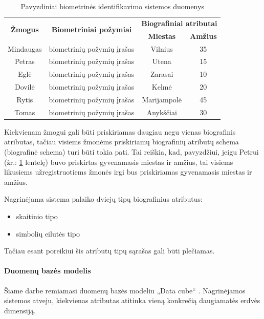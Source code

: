 \begin{table}[H]\footnotesize
	\centering
	\begin{tabular}{|c|c|c|c|}
		\hline
		\multirow{2}{*}{{\bf Žmogus}} & \multirow{2}{*}{{\bf Biometriniai požymiai}} & \multicolumn{2}{|c|}{{\bf Biografiniai atributai}}  \\ \cline{3-4}
		& & {\bf Miestas} & {\bf Amžius} \\
		\hline
		Mindaugas & biometrinių požymių įrašas & Vilnius & 35 \\ \cline{2-4}
		\hline
		Petras & biometrinių požymių įrašas & Utena & 15 \\ \cline{2-4}
		\hline
		Eglė & biometrinių požymių įrašas & Zarasai & 10 \\ \cline{2-4}
		\hline
		Dovilė & biometrinių požymių įrašas & Kelmė & 20 \\ \cline{2-4}
		\hline
		Rytis & biometrinių požymių įrašas & Marijampolė & 45 \\ \cline{2-4}
		\hline
		Tomas & biometrinių požymių įrašas & Anykščiai & 30 \\ \cline{2-4}
		\hline
	\end{tabular}
	\caption{Pavyzdiniai biometrinės identifikavimo sistemos duomenys}
	\label{tab:exampleGallery}
\end{table}

Kiekvienam žmogui gali būti priskiriamas daugiau negu vienas biografinis atributas, tačiau visiems žmonėms priskiriamų biografinių atributų schema (biografinė schema) turi būti tokia pati.
Tai reiškia, kad, pavyzdžiui, jeigu Petrui (žr.: \ref{tab:exampleGallery} lentelę) buvo priskirtas gyvenamasis miestas ir amžius, tai visiems likusiems užregistruotiems žmonės irgi bus priskiriamas gyvenamasis miestas ir amžius.

Nagrinėjama sistema palaiko dviejų tipų biografinius atributus:
\begin{itemize}
\item skaitinio tipo
\item simbolių eilutės tipo
\end{itemize}
Tačiau esant poreikiui šis atributų tipų sąrašas gali būti plečiamas.






\paragraph{Duomenų bazės modelis}

Šiame darbe remiamasi duomenų bazės modeliu „Data cube“ \cite{marcel2000modeling}.
Nagrinėjamos sistemos atveju, kiekvienas atributas atitinka vieną konkrečią daugiamatės erdvės dimensiją.

